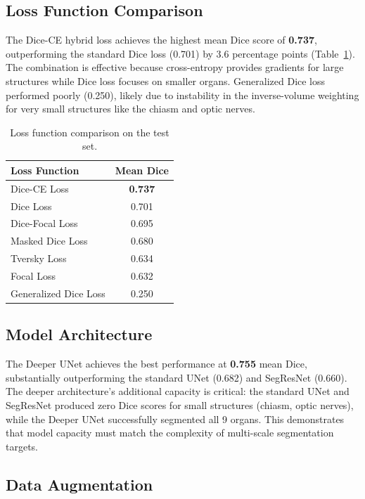 \documentclass[10pt,twocolumn]{article}
\begin{document}
\subsection{Loss Function Comparison}

The Dice-CE hybrid loss achieves the highest mean Dice score of \textbf{0.737}, outperforming the standard Dice loss (0.701) by 3.6 percentage points (Table~\ref{tab:loss}). The combination is effective because cross-entropy provides gradients for large structures while Dice loss focuses on smaller organs. Generalized Dice loss performed poorly (0.250), likely due to instability in the inverse-volume weighting for very small structures like the chiasm and optic nerves.

\begin{table}[htbp]
\centering
\caption{Loss function comparison on the test set.}
\label{tab:loss}
\small
\begin{tabular}{lc}
\toprule
\textbf{Loss Function} & \textbf{Mean Dice} \\
\midrule
Dice-CE Loss & \textbf{0.737} \\
Dice Loss & 0.701 \\
Dice-Focal Loss & 0.695 \\
Masked Dice Loss & 0.680 \\
Tversky Loss & 0.634 \\
Focal Loss & 0.632 \\
Generalized Dice Loss & 0.250 \\
\bottomrule
\end{tabular}
\end{table}

\subsection{Model Architecture}

The Deeper UNet achieves the best performance at \textbf{0.755} mean Dice, substantially outperforming the standard UNet (0.682) and SegResNet (0.660). The deeper architecture's additional capacity is critical: the standard UNet and SegResNet produced zero Dice scores for small structures (chiasm, optic nerves), while the Deeper UNet successfully segmented all 9 organs. This demonstrates that model capacity must match the complexity of multi-scale segmentation targets.

\subsection{Data Augmentation}
\end{document}
